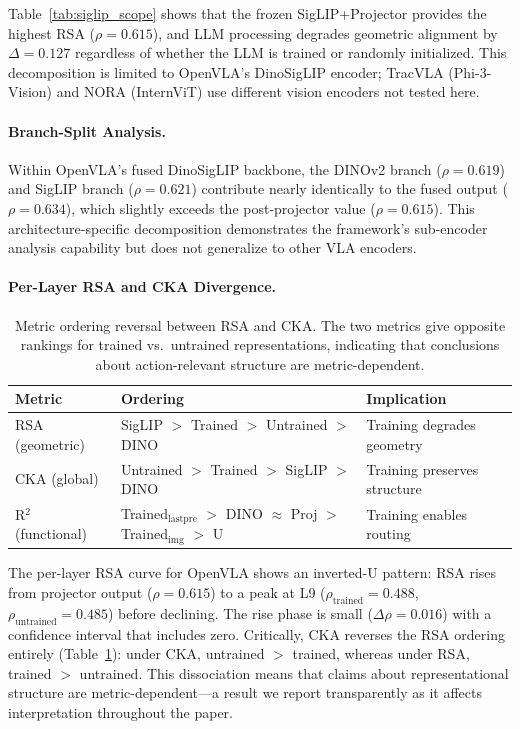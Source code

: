 \documentclass[letterpaper]{article}
\begin{document}
Table~\ref{tab:siglip_scope} shows that the frozen SigLIP+Projector provides the highest RSA ($\rho = 0.615$), and LLM processing degrades geometric alignment by $\Delta = 0.127$ regardless of whether the LLM is trained or randomly initialized. This decomposition is limited to OpenVLA's DinoSigLIP encoder; TracVLA (Phi-3-Vision) and NORA (InternViT) use different vision encoders not tested here.

\paragraph{Branch-Split Analysis.}
Within OpenVLA's fused DinoSigLIP backbone, the DINOv2 branch ($\rho = 0.619$) and SigLIP branch ($\rho = 0.621$) contribute nearly identically to the fused output ($\rho = 0.634$), which slightly exceeds the post-projector value ($\rho = 0.615$). This architecture-specific decomposition demonstrates the framework's sub-encoder analysis capability but does not generalize to other VLA encoders.

\paragraph{Per-Layer RSA and CKA Divergence.}

\begin{table}[h]
\centering
\caption{Metric ordering reversal between RSA and CKA. The two metrics give opposite rankings for trained vs.\ untrained representations, indicating that conclusions about action-relevant structure are metric-dependent.}
\label{tab:metric_reversal}
\begin{tabular}{lll}
\toprule
Metric & Ordering & Implication \\
\midrule
RSA (geometric) & SigLIP $>$ Trained $>$ Untrained $>$ DINO & Training degrades geometry \\
CKA (global) & Untrained $>$ Trained $>$ SigLIP $>$ DINO & Training preserves structure \\
R$^2$ (functional) & Trained$_{\text{lastpre}}$ $>$ DINO $\approx$ Proj $>$ Trained$_{\text{img}}$ $>$ U & Training enables routing \\
\bottomrule
\end{tabular}
\end{table}

The per-layer RSA curve for OpenVLA shows an inverted-U pattern: RSA rises from projector output ($\rho = 0.615$) to a peak at L9 ($\rho_{\text{trained}} = 0.488$, $\rho_{\text{untrained}} = 0.485$) before declining. The rise phase is small ($\Delta\rho = 0.016$) with a confidence interval that includes zero. Critically, CKA reverses the RSA ordering entirely (Table~\ref{tab:metric_reversal}): under CKA, untrained $>$ trained, whereas under RSA, trained $>$ untrained. This dissociation means that claims about representational structure are metric-dependent---a result we report transparently as it affects interpretation throughout the paper.
\end{document}
